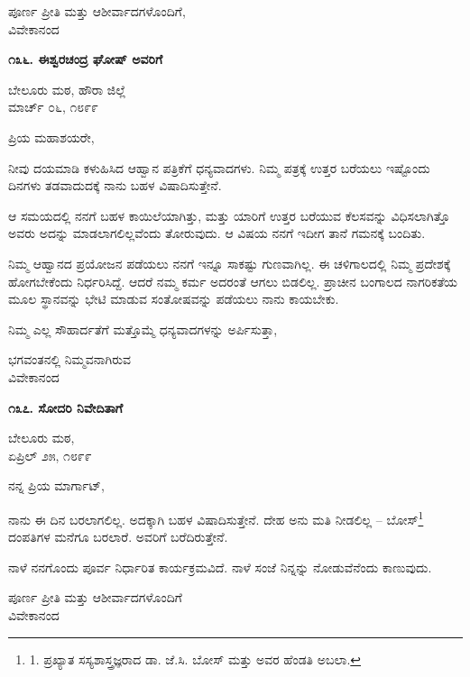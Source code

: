 \begin{flushright}
ಪೂರ್ಣ ಪ್ರೀತಿ ಮತ್ತು ಆಶೀರ್ವಾದಗಳೊಂದಿಗೆ,\\ವಿವೇಕಾನಂದ
\end{flushright}

\begin{center}
\textbf{೧೩೬. ಈಶ್ವರಚಂದ್ರ ಘೋಷ್ ಅವರಿಗೆ}
\end{center}

\begin{flushright}
ಬೇಲೂರು ಮಠ, ಹೌರಾ ಜಿಲ್ಲೆ\\ಮಾರ್ಚ್ ೦೬, ೧೮೯೯
\end{flushright}

ಪ್ರಿಯ ಮಹಾಶಯರೇ,

ನೀವು ದಯಮಾಡಿ ಕಳುಹಿಸಿದ ಆಹ್ವಾನ ಪತ್ರಿಕೆಗೆ ಧನ್ಯವಾದಗಳು. ನಿಮ್ಮ ಪತ್ರಕ್ಕೆ ಉತ್ತರ ಬರೆಯಲು ಇಷ್ಟೊಂದು ದಿನಗಳು ತಡವಾದುದಕ್ಕೆ ನಾನು ಬಹಳ ವಿಷಾದಿಸುತ್ತೇನೆ.

ಆ ಸಮಯದಲ್ಲಿ ನನಗೆ ಬಹಳ ಕಾಯಿಲೆಯಾಗಿತ್ತು, ಮತ್ತು ಯಾರಿಗೆ ಉತ್ತರ ಬರೆಯುವ ಕೆಲಸವನ್ನು ವಿಧಿಸಲಾಗಿತ್ತೊ ಅವರು ಅದನ್ನು ಮಾಡಲಾಗಲಿಲ್ಲವೆಂದು ತೋರುವುದು. ಆ ವಿಷಯ ನನಗೆ ಇದೀಗ ತಾನೆ ಗಮನಕ್ಕೆ ಬಂದಿತು.

ನಿಮ್ಮ ಆಹ್ವಾನದ ಪ್ರಯೋಜನ ಪಡೆಯಲು ನನಗೆ ಇನ್ನೂ ಸಾಕಷ್ಟು ಗುಣವಾಗಿಲ್ಲ. ಈ ಚಳಿಗಾಲದಲ್ಲಿ ನಿಮ್ಮ ಪ್ರದೇಶಕ್ಕೆ ಹೋಗಬೇಕೆಂದು ನಿರ್ಧರಿಸಿದ್ದೆ. ಆದರೆ ನಮ್ಮ ಕರ್ಮ ಅದರಂತೆ ಆಗಲು ಬಿಡಲಿಲ್ಲ. ಪ್ರಾಚೀನ ಬಂಗಾಲದ ನಾಗರಿಕತೆಯ ಮೂಲ ಸ್ಥಾನವನ್ನು ಭೇಟಿ ಮಾಡುವ ಸಂತೋಷವನ್ನು ಪಡೆಯಲು ನಾನು ಕಾಯಬೇಕು.

ನಿಮ್ಮ ಎಲ್ಲ ಸೌಹಾರ್ದತೆಗೆ ಮತ್ತೊಮ್ಮೆ ಧನ್ಯವಾದಗಳನ್ನು ಅರ್ಪಿಸುತ್ತಾ,

\begin{flushright}
ಭಗವಂತನಲ್ಲಿ ನಿಮ್ಮವನಾಗಿರುವ\\ವಿವೇಕಾನಂದ
\end{flushright}

\begin{center}
\textbf{೧೩೭. ಸೋದರಿ ನಿವೇದಿತಾಗೆ}
\end{center}

\begin{flushright}
ಬೇಲೂರು ಮಠ,\\ಏಪ್ರಿಲ್ ೨೫, ೧೮೯೯
\end{flushright}

ನನ್ನ ಪ್ರಿಯ ಮಾರ್ಗಾಟ್,

ನಾನು ಈ ದಿನ ಬರಲಾಗಲಿಲ್ಲ. ಅದಕ್ಕಾಗಿ ಬಹಳ ವಿಷಾದಿಸುತ್ತೇನೆ. ದೇಹ ಅನು ಮತಿ ನೀಡಲಿಲ್ಲ – ಬೋಸ್\footnote{1. ಪ್ರಖ್ಯಾತ ಸಸ್ಯಶಾಸ್ತ್ರಜ್ಞರಾದ ಡಾ. ಜೆ.ಸಿ. ಬೋಸ್ ಮತ್ತು ಅವರ ಹೆಂಡತಿ ಅಬಲಾ.} ದಂಪತಿಗಳ ಮನೆಗೂ ಬರಲಾರೆ. ಅವರಿಗೆ ಬರೆದಿರುತ್ತೇನೆ.

ನಾಳೆ ನನಗೊಂದು ಪೂರ್ವ ನಿರ್ಧಾರಿತ ಕಾರ್ಯಕ್ರಮವಿದೆ. ನಾಳೆ ಸಂಜೆ ನಿನ್ನನ್ನು ನೋಡುವೆನೆಂದು ಕಾಣುವುದು.

\begin{flushright}
ಪೂರ್ಣ ಪ್ರೀತಿ ಮತ್ತು ಆಶೀರ್ವಾದಗಳೊಂದಿಗೆ\\ವಿವೇಕಾನಂದ
\end{flushright}

